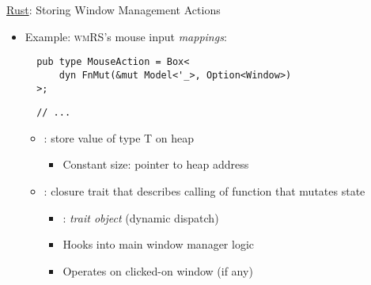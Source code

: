 \begin{frame}[fragile]{\underline{Rust}: Storing Window Management Actions \hfill {\footnotesize \currentname}}


    \begin{itemize}

        \item Example: \textsc{wmRS}'s mouse input \textit{mappings}:\\[3pt]
\begin{verbatim}
  pub type MouseAction = Box<
      dyn FnMut(&mut Model<'_>, Option<Window>)
  >;
\end{verbatim}
\begin{verbatim}
  // ...
\end{verbatim}

    \vspace*{5pt}\begin{itemize}

        \item {}: store value of type T on heap
            \begin{itemize}
                \item Constant size: pointer to heap address
            \end{itemize}

        \item {}: closure trait that describes calling of function that mutates state
            \begin{itemize}
                \item {}: \textit{trait object} (dynamic dispatch)
                \item Hooks into main window manager logic
                \item Operates on clicked-on window (if any)
            \end{itemize}

    \end{itemize}

    \end{itemize}

    \vfill

\end{frame}
